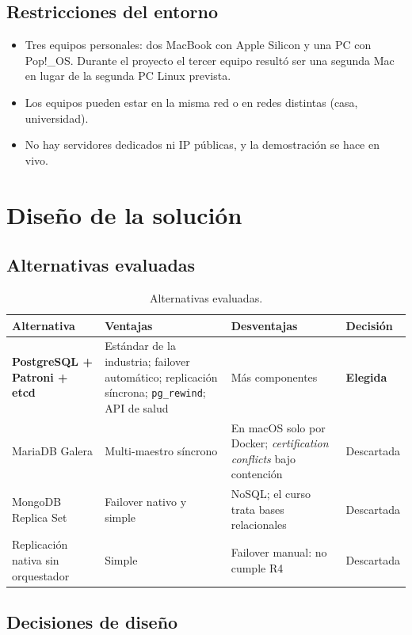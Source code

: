 \documentclass[11pt,a4paper]{article}
\newcommand{\cod}[1]{\texttt{#1}}
\begin{document}
\subsection{Restricciones del entorno}

\begin{itemize}
  \item Tres equipos personales: dos MacBook con Apple Silicon y una PC con Pop!\_OS. Durante el proyecto el tercer equipo resultó ser una segunda Mac en lugar de la segunda PC Linux prevista.
  \item Los equipos pueden estar en la misma red o en redes distintas (casa, universidad).
  \item No hay servidores dedicados ni IP públicas, y la demostración se hace en vivo.
\end{itemize}

\section{Diseño de la solución}

\subsection{Alternativas evaluadas}

\begin{table}[H]
\centering
\small
\caption{Alternativas evaluadas.}
\begin{tabularx}{\textwidth}{@{}L{3.3cm}YYl@{}}
\toprule
\textbf{Alternativa} & \textbf{Ventajas} & \textbf{Desventajas} & \textbf{Decisión} \\
\midrule
\textbf{PostgreSQL + Patroni + etcd} & Estándar de la industria; failover automático; replicación síncrona; \cod{pg\_rewind}; API de salud & Más componentes & \textbf{Elegida} \\
MariaDB Galera & Multi-maestro síncrono & En macOS solo por Docker; \emph{certification conflicts} bajo contención & Descartada \\
MongoDB Replica Set & Failover nativo y simple & NoSQL; el curso trata bases relacionales & Descartada \\
Replicación nativa sin orquestador & Simple & Failover manual: no cumple R4 & Descartada \\
\bottomrule
\end{tabularx}
\end{table}

\subsection{Decisiones de diseño}
\end{document}
